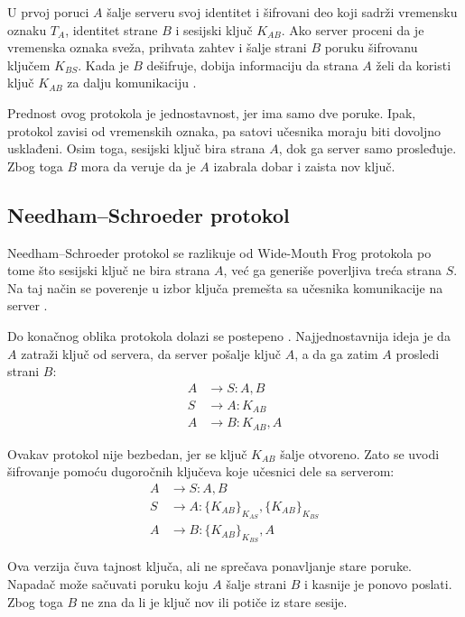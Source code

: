 U prvoj poruci \(A\) šalje serveru svoj identitet i šifrovani deo koji sadrži vremensku oznaku \(T_A\), identitet strane \(B\) i sesijski ključ \(K_{AB}\). Ako server proceni da je vremenska oznaka sveža, prihvata zahtev i šalje strani \(B\) poruku šifrovanu ključem \(K_{BS}\). Kada je \(B\) dešifruje, dobija informaciju da strana \(A\) želi da koristi ključ \(K_{AB}\) za dalju komunikaciju \cite{smart2016cryptography}.

Prednost ovog protokola je jednostavnost, jer ima samo dve poruke. Ipak, protokol zavisi od vremenskih oznaka, pa satovi učesnika moraju biti dovoljno usklađeni. Osim toga, sesijski ključ bira strana \(A\), dok ga server samo prosleđuje. Zbog toga \(B\) mora da veruje da je \(A\) izabrala dobar i zaista nov ključ\cite{smart2016cryptography}.

\subsection{Needham--Schroeder protokol}

Needham--Schroeder protokol se razlikuje od Wide-Mouth Frog protokola po tome što sesijski ključ ne bira strana \(A\), već ga generiše poverljiva treća strana \(S\). Na taj način se poverenje u izbor ključa premešta sa učesnika komunikacije na server \cite{smart2016cryptography}.

Do konačnog oblika protokola dolazi se postepeno \cite{smart2016cryptography}. Najjednostavnija ideja je da \(A\) zatraži ključ od servera, da server pošalje ključ \(A\), a da ga zatim \(A\) prosledi strani \(B\):
\[ \begin{aligned} A &\rightarrow S : A, B \\ S &\rightarrow A : K_{AB} \\ A &\rightarrow B : K_{AB}, A \end{aligned} \]

Ovakav protokol nije bezbedan, jer se ključ \(K_{AB}\) šalje otvoreno. Zato se uvodi šifrovanje pomoću dugoročnih ključeva koje učesnici dele sa serverom:
\[ \begin{aligned} A &\rightarrow S : A, B \\ S &\rightarrow A : \{K_{AB}\}_{K_{AS}}, \{K_{AB}\}_{K_{BS}} \\ A &\rightarrow B : \{K_{AB}\}_{K_{BS}}, A \end{aligned} \]

Ova verzija čuva tajnost ključa, ali ne sprečava ponavljanje stare poruke. Napadač može sačuvati poruku koju \(A\) šalje strani \(B\) i kasnije je ponovo poslati. Zbog toga \(B\) ne zna da li je ključ nov ili potiče iz stare sesije.


